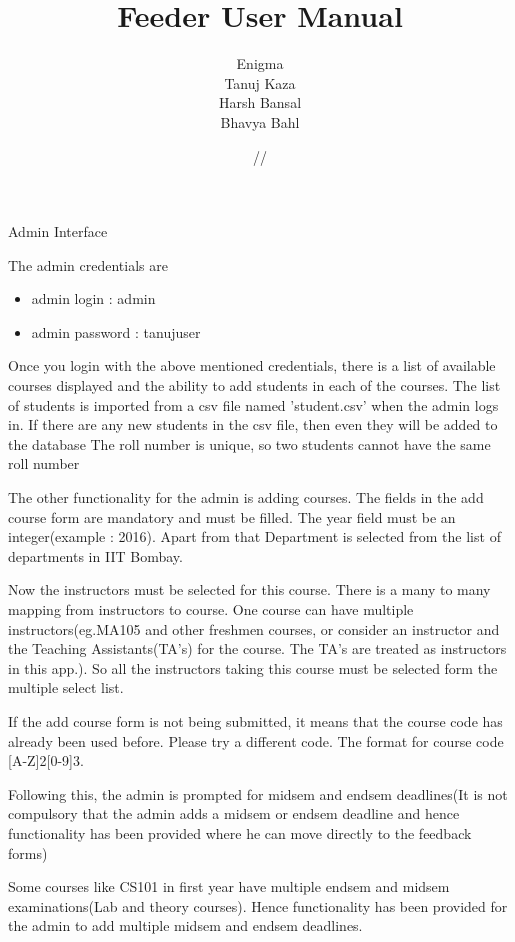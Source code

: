 \documentclass[11pt]{report}
\title{\textbf{Feeder User Manual}}
\author{Enigma\\ Tanuj Kaza \\ Harsh Bansal \\ Bhavya Bahl \\}
\date{\oldstylenums{05}/\oldstylenums{11}/\oldstylenums{16}}
\begin{document}
\maketitle 
\begin{outline}
	\item Admin Interface
    \begin{outline}
    	\item The admin credentials are 
    		\begin{itemize}
    			\item admin login : admin
				\item admin password : tanujuser
    		\end{itemize}
    	\item Once you login with the above mentioned credentials, there is a list of available courses displayed and the ability to add students in each of the courses. The list of students is imported from a csv file named 'student.csv' when the admin logs in. If there are any new students in the csv file, then even they will be added to the database
The roll number is unique, so two students cannot have the same roll number
    	\item The other functionality for the admin is adding courses. The fields in the add course form are mandatory and must be filled. The year field must be an integer(example : 2016). Apart from that Department is selected from the list of departments in IIT Bombay.
    	\item Now the instructors must be selected for this course. There is a many to many mapping from instructors to course. One course can have multiple instructors(eg.MA105 and other freshmen courses, or consider an instructor and the Teaching Assistants(TA's) for the course. The TA's are treated as instructors in this app.). So all the instructors taking this course must be selected form the multiple select list.
		\item If the add course form is not being submitted, it means that the course code has already been used before. Please try a different code. The format for course code [A-Z]{2}[0-9]{3}. 
		\item Following this, the admin is prompted for midsem and endsem deadlines(It is not compulsory that the admin adds a midsem or endsem deadline and hence functionality has been provided where he can move directly to the feedback forms)
		\item Some courses like CS101 in first year have multiple endsem and midsem examinations(Lab and theory courses). Hence functionality has been provided for the admin to add multiple midsem and endsem deadlines.

\end{outline}
\end{outline}
\end{document}
